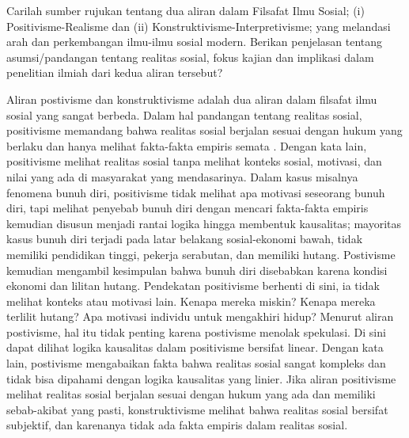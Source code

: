 \question
Carilah sumber rujukan tentang dua aliran dalam Filsafat Ilmu Sosial; (i) Positivisme-Realisme dan (ii) Konstruktivisme-Interpretivisme; yang melandasi arah dan perkembangan ilmu-ilmu sosial modern.
Berikan penjelasan tentang asumsi/pandangan tentang realitas sosial, fokus kajian dan implikasi dalam penelitian ilmiah dari kedua aliran tersebut?
\begin{solution}
	Aliran postivisme dan konstruktivisme adalah dua aliran dalam filsafat ilmu sosial yang sangat berbeda. Dalam hal pandangan tentang realitas sosial, positivisme memandang bahwa realitas sosial berjalan sesuai dengan hukum yang berlaku dan hanya melihat fakta-fakta empiris semata \cite{armstrong_positivism_2013}.
	Dengan kata lain, positivisme melihat realitas sosial tanpa melihat konteks sosial, motivasi, dan nilai yang ada di masyarakat yang mendasarinya.
	Dalam kasus misalnya fenomena bunuh diri, positivisme tidak melihat apa motivasi seseorang bunuh diri, tapi melihat penyebab bunuh diri dengan mencari fakta-fakta empiris kemudian disusun menjadi rantai logika hingga membentuk kausalitas; mayoritas kasus bunuh diri terjadi pada latar belakang sosial-ekonomi bawah, tidak memiliki pendidikan tinggi, pekerja serabutan, dan memiliki hutang.
	Postivisme kemudian mengambil kesimpulan bahwa bunuh diri disebabkan karena kondisi ekonomi dan lilitan hutang.
	Pendekatan positivisme berhenti di sini, ia tidak melihat konteks atau motivasi lain.
	Kenapa mereka miskin? Kenapa mereka terlilit hutang? Apa motivasi individu untuk mengakhiri hidup?
	Menurut aliran postivisme, hal itu tidak penting karena postivisme menolak spekulasi.
	Di sini dapat dilihat logika kausalitas dalam positivisme bersifat linear.
	Dengan kata lain, postivisme mengabaikan fakta bahwa realitas sosial sangat kompleks dan tidak bisa dipahami dengan logika kausalitas yang linier.
	Jika aliran positivisme melihat realitas sosial berjalan sesuai dengan hukum yang ada dan memiliki sebab-akibat yang pasti, konstruktivisme melihat bahwa realitas sosial bersifat subjektif, dan karenanya tidak ada fakta empiris dalam realitas sosial.
	

\end{solution}
